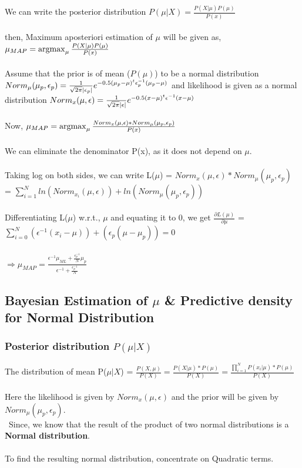 \documentclass[fleqn]{article}
\newcommand{\argmax}{\operatornamewithlimits{argmax}}
\begin{document}
We can write the posterior distribution $P(\mu|X) = \frac{P(X|\mu)P(\mu)}{P(x)}$\\\\
then, Maximum aposteriori estimation of $\mu$ will be given as, $\mu_{MAP} = \argmax_{\mu} \frac{P(X|\mu)P(\mu)}{P(x)}$\\\\
Assume that the prior is of mean ($P(\mu)$) to be a normal distribution $Norm_\mu(\mu_p, \epsilon_p) = {{1}\over{\sqrt{2\pi}|\epsilon_p|}} e^{-0.5(\mu_p-\mu)^{t}\epsilon_p^{-1}(\mu_p-\mu)}$ and likelihood is given as a normal distribution $Norm_x(\mu, \epsilon) = {{1}\over{\sqrt{2\pi}|\epsilon|}} e^{-0.5(x-\mu)^{t}\epsilon^{-1}(x-\mu)}$\\\\
Now, $\mu_{MAP} = \argmax_{\mu} \frac{Norm_x(\mu, \epsilon) * Norm_\mu(\mu_p, \epsilon_p)}{P(x)}$\\\\
We can eliminate the denominator P(x), as it does not depend on $\mu$.\\\\
Taking log on both sides, we can write L($\mu$) =  ${Norm_x(\mu, \epsilon) * Norm_\mu(\mu_p, \epsilon_p)}$ = $\sum_{i=1}^{N}{ln(Norm_{x_i}(\mu, \epsilon)) + ln(Norm_\mu(\mu_p, \epsilon_p))}$\\\\
Differentiating L($\mu$) w.r.t., $\mu$ and equating it to 0, we get $\frac{\partial L(\mu)}{\partial \mu}$ = $\sum_{i=0}^{N}(\epsilon^{-1}(x_i - \mu)) + (\epsilon_p(\mu - \mu_p)) = 0$\\\\
$\Longrightarrow \mu_{MAP} = \frac{\epsilon^{-1}\mu_{ML} + \frac{\epsilon_p^{-1}}{N}\mu_p}{\epsilon^{-1} + \frac{\epsilon_p^{-1}}{N}}$ 

\subsection{Bayesian Estimation of $\mu$ \& Predictive density for Normal Distribution}
\subsubsection{Posterior distribution $P(\mu|X)$}
The distribution of mean P($\mu|X$) = $\frac{P(X, \mu)}{P(X)} = \frac{P(X|\mu)*P(\mu)}{P(X)} = \frac{\prod_{i=1}^{N} P(x_i|\mu)*P(\mu)}{P(X)} $\\\\
Here the likelihood is given by $Norm_x(\mu, \epsilon)$ and the prior will be given by $Norm_\mu(\mu_p, \epsilon_p)$. \\\
Since, we know that the result of the product of two normal distributions is a \textbf{Normal distribution}. \\\\
To find the resulting normal distribution, concentrate on Quadratic terms.\\\\ 
\end{document}
